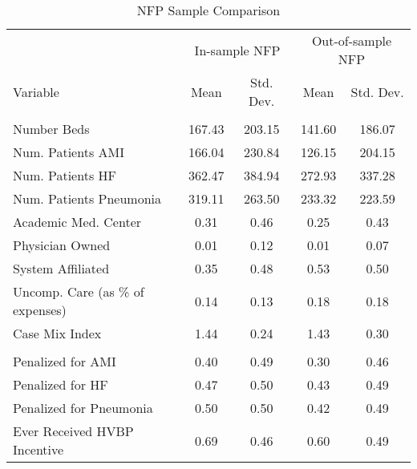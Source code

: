 \begin{table}[ht!]
\centering
\caption{\label{nfp_sample_compare}NFP Sample Comparison}
\centering
\begin{tabular}[t]{lcccc}
\toprule
\multicolumn{1}{c}{ } & \multicolumn{2}{c}{In-sample NFP} & \multicolumn{2}{c}{Out-of-sample NFP} \\
\cmidrule(l{3pt}r{3pt}){2-3} \cmidrule(l{3pt}r{3pt}){4-5}
Variable & Mean & Std. Dev. & Mean & Std. Dev.\\
\midrule
\addlinespace[0.3em]
\multicolumn{5}{l}{\textbf{Hospital Characteristics}}\\
\hspace{1em}Number Beds & 167.43 & 203.15 & 141.60 & 186.07\\
\hspace{1em}Num. Patients AMI & 166.04 & 230.84 & 126.15 & 204.15\\
\hspace{1em}Num. Patients HF & 362.47 & 384.94 & 272.93 & 337.28\\
\hspace{1em}Num. Patients Pneumonia & 319.11 & 263.50 & 233.32 & 223.59\\
\hspace{1em}Academic Med. Center & 0.31 & 0.46 & 0.25 & 0.43\\
\hspace{1em}Physician Owned & 0.01 & 0.12 & 0.01 & 0.07\\
\hspace{1em}System Affiliated & 0.35 & 0.48 & 0.53 & 0.50\\
\hspace{1em}Uncomp. Care (as \% of expenses) & 0.14 & 0.13 & 0.18 & 0.18\\
\hspace{1em}Case Mix Index & 1.44 & 0.24 & 1.43 & 0.30\\
\addlinespace[0.3em]
\multicolumn{5}{l}{\textbf{Penalty/Payment Variables}}\\
\hspace{1em}Penalized for AMI & 0.40 & 0.49 & 0.30 & 0.46\\
\hspace{1em}Penalized for HF & 0.47 & 0.50 & 0.43 & 0.49\\
\hspace{1em}Penalized for Pneumonia & 0.50 & 0.50 & 0.42 & 0.49\\
\hspace{1em}Ever Received HVBP Incentive & 0.69 & 0.46 & 0.60 & 0.49\\

\end{tabular}
\end{table}
